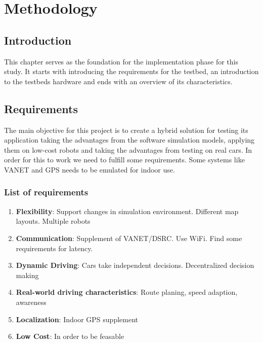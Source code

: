\chapter{Methodology}
\label{chp:Methodology} 

\section{Introduction}
This chapter serves as the foundation for the implementation phase for this study. It starts with introducing the requirements for the testbed, an introduction to the testbeds hardware and ends with an overview of its characteristics.

\section{Requirements}
The main objective for this project is to create a hybrid solution for testing \gls{its} application taking the advantages from the software simulation models, applying them on low-cost robots and taking the advantages from testing on real cars. In order for this to work we need to fulfill some requirements. Some systems like VANET and GPS needs to be emulated for indoor use. 

\subsection{List of requirements}
\begin{enumerate}
\item \textbf{Flexibility}: Support changes in simulation environment. Different map layouts. Multiple robots

\item \textbf{Communication}: Supplement of VANET/DSRC. Use WiFi. Find some requirements for latency.

\item \textbf{Dynamic Driving}: Cars take independent decisions. Decentralized decision making

\item \textbf{Real-world driving characteristics}: Route planing, speed adaption, awareness

\item \textbf{Localization}: Indoor GPS supplement

\item \textbf{Low Cost}: In order to be feasable 

\end{enumerate}

